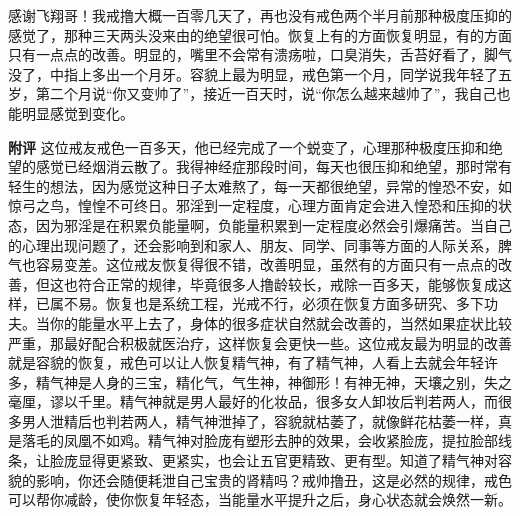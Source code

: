 \begin{case}
    感谢飞翔哥！我戒撸大概一百零几天了，再也没有戒色两个半月前那种极度压抑的感觉了，那种三天两头没来由的绝望很可怕。恢复上有的方面恢复明显，有的方面只有一点点的改善。明显的，嘴里不会常有溃疡啦，口臭消失，舌苔好看了，脚气没了，中指上多出一个月牙。容貌上最为明显，戒色第一个月，同学说我年轻了五岁，第二个月说“你又变帅了”，接近一百天时，说“你怎么越来越帅了”，我自己也能明显感觉到变化。

    \textbf{附评} 这位戒友戒色一百多天，他已经完成了一个蜕变了，心理那种极度压抑和绝望的感觉已经烟消云散了。我得神经症那段时间，每天也很压抑和绝望，那时常有轻生的想法，因为感觉这种日子太难熬了，每一天都很绝望，异常的惶恐不安，如惊弓之鸟，惶惶不可终日。邪淫到一定程度，心理方面肯定会进入惶恐和压抑的状态，因为邪淫是在积累负能量啊，负能量积累到一定程度必然会引爆痛苦。当自己的心理出现问题了，还会影响到和家人、朋友、同学、同事等方面的人际关系，脾气也容易变差。这位戒友恢复得很不错，改善明显，虽然有的方面只有一点点的改善，但这也符合正常的规律，毕竟很多人撸龄较长，戒除一百多天，能够恢复成这样，已属不易。恢复也是系统工程，光戒不行，必须在恢复方面多研究、多下功夫。当你的能量水平上去了，身体的很多症状自然就会改善的，当然如果症状比较严重，那最好配合积极就医治疗，这样恢复会更快一些。这位戒友最为明显的改善就是容貌的恢复，戒色可以让人恢复精气神，有了精气神，人看上去就会年轻许多，精气神是人身的三宝，精化气，气生神，神御形！有神无神，天壤之别，失之毫厘，谬以千里。精气神就是男人最好的化妆品，很多女人卸妆后判若两人，而很多男人泄精后也判若两人，精气神泄掉了，容貌就枯萎了，就像鲜花枯萎一样，真是落毛的凤凰不如鸡。精气神对脸庞有塑形去肿的效果，会收紧脸庞，提拉脸部线条，让脸庞显得更紧致、更紧实，也会让五官更精致、更有型。知道了精气神对容貌的影响，你还会随便耗泄自己宝贵的肾精吗？戒帅撸丑，这是必然的规律，戒色可以帮你减龄，使你恢复年轻态，当能量水平提升之后，身心状态就会焕然一新。
\end{case}

